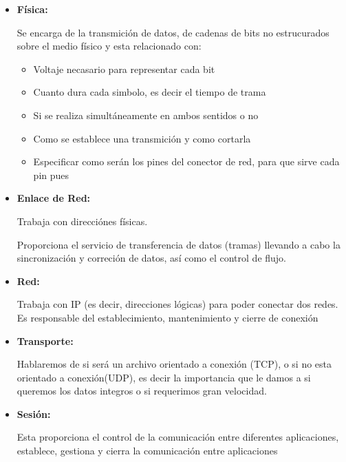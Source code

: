 \documentclass[12pt, fleqn]{report}                             %
\theoremstyle{break}                                            %
\begin{document}
            \begin{itemize}
                
                \item \textbf{Física:} 

                    Se encarga de la transmición de datos, de cadenas de bits no estrucurados sobre el medio
                    físico y esta relacionado con:
                    \begin{itemize}
                        \item Voltaje necasario para representar cada bit
                        \item Cuanto dura cada simbolo, es decir el tiempo de trama
                        \item Si se realiza simultáneamente en ambos sentidos o no
                        \item Como se establece una transmición y como cortarla
                        \item Especificar como serán los pines del conector de red, para que sirve cada pin pues
                    \end{itemize}

                \item \textbf{Enlace de Red:} 

                    Trabaja con direcciónes físicas.

                    Proporciona el servicio de transferencia de datos (tramas) llevando a cabo la sincronización y correción
                    de datos, así como el control de flujo.

                \item \textbf{Red:}

                    Trabaja con IP (es decir, direcciones lógicas) para poder conectar dos redes. Es responsable del establecimiento, mantenimiento y cierre de conexión

                \item \textbf{Transporte:}

                    Hablaremos de si será un archivo orientado a conexión (TCP), o si no esta orientado a conexión(UDP), es
                    decir la importancia que le damos a si queremos los datos integros o si requerimos gran velocidad.

                \item \textbf{Sesión:}

                    Esta proporciona el control de la comunicación entre diferentes aplicaciones, establece, gestiona y
                    cierra la comunicación entre aplicaciones


\end{itemize}
\end{document}
